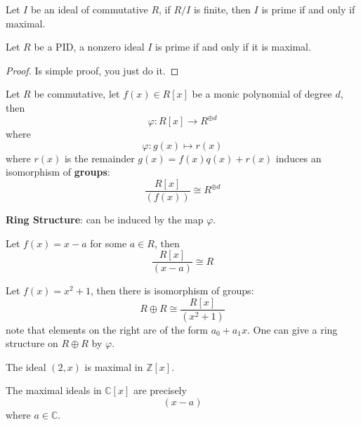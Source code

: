 \documentclass[openany]{book}
\newcommand{\Z}{\mathbb{Z}}
\newcommand{\C}{\mathbb{C}}
\begin{document}
\begin{prop}
    Let $I$ be an ideal of commutative $R$, if $R/I$ is finite, then $I$ is prime if and only if maximal.
\end{prop}

\begin{prop}
    Let $R$ be a PID, a nonzero ideal $I$ is prime if and only if it is maximal.
\end{prop}
\begin{proof}
    Is simple proof, you just do it.
\end{proof}


\begin{thm}
    Let $R$ be commutative, let $f(x)\in R[x]$ be a monic polynomial of degree $d$, then 
    \begin{equation*}
        \varphi: R[x]\to R^{\oplus d}
    \end{equation*}
    where 
    \begin{equation*}
        \varphi: g(x)\mapsto r(x)
    \end{equation*}
    where $r(x)$ is the remainder $g(x)=f(x)q(x)+r(x)$ induces an isomorphism of \textbf{groups}:
    \begin{equation*}
        \frac{R[x]}{(f(x))}\cong R^{\oplus d}
    \end{equation*}
\end{thm}
\textbf{Ring Structure}: can be induced by the map $\varphi$.

\begin{example}
    Let $f(x)=x-a$ for some $a\in R$, then 
    \begin{equation*}
        \frac{R[x]}{(x-a)}\cong R
    \end{equation*}
\end{example}
\begin{example}
    Let $f(x)=x^2+1$, then there is isomorphism of groups:
    \begin{equation*}
        R\oplus R\cong\frac{R[x]}{(x^2+1)}
    \end{equation*}
    note that elements on the right are of the form $a_0+a_1x$. One can give a ring structure on $R\oplus R$ by $\varphi$.
\end{example}

\begin{example}
    The ideal $(2,x)$ is maximal in $\Z[x]$.
\end{example}

\begin{example}
    The maximal ideals in $\C[x]$ are precisely 
    \begin{equation*}
        (x-a)
    \end{equation*}
    where $a\in\C$.
\end{example}
\end{document}
